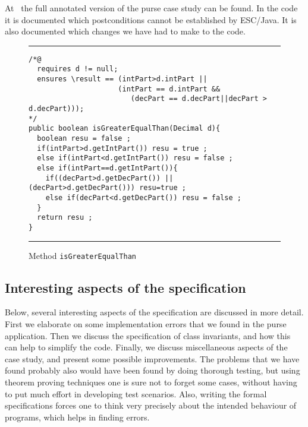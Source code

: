 \documentclass[a4paper]{llncs}
\begin{document}
At~\cite{CatanoH01Url} the full annotated version of the purse case
study can be found. In the code it is documented which postconditions
cannot be established by ESC/Java. It is also documented which changes 
we have had to make to the code.


\begin{figure}[t]
\rule{\linewidth}{0.3mm}
\begin{verbatim}
/*@
  requires d != null;
  ensures \result == (intPart>d.intPart ||
                     (intPart == d.intPart && 
                        (decPart == d.decPart||decPart > d.decPart)));
*/
public boolean isGreaterEqualThan(Decimal d){
  boolean resu = false ;
  if(intPart>d.getIntPart()) resu = true ;
  else if(intPart<d.getIntPart()) resu = false ;
  else if(intPart==d.getIntPart()){
    if((decPart>d.getDecPart()) || (decPart>d.getDecPart())) resu=true ;
    else if(decPart<d.getDecPart()) resu = false ;
  }
  return resu ;
}
\end{verbatim}
\caption{Method {\tt isGreaterEqualThan}}
\label{fig-cla-dec}
\rule{\linewidth}{0.3mm}
\end{figure}


\subsection{Interesting aspects of the specification}\label{SectSpecDetails}
Below, several interesting aspects of the specification are discussed
in more detail. First we elaborate on some implementation errors that
we found in the purse application.  Then we discuss the specification
of class invariants, and how this can help to simplify the
code. Finally, we discuss miscellaneous aspects of the case study, and
present some possible improvements. The problems that we have found
probably also would have been found by doing thorough testing, but
using theorem proving techniques one is sure not to forget some cases,
without having to put much effort in developing test scenarios.  Also,
writing the formal specifications forces one to think very precisely
about the intended behaviour of programs, which helps in finding
errors.
\end{document}
